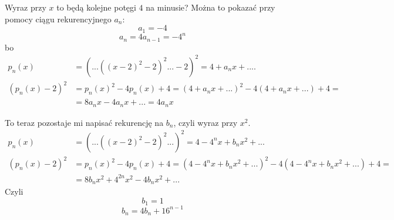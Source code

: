 \documentclass{article}
\begin{document}
Wyraz przy $x$ to będą kolejne potęgi $4$ na minusie? Można to pokazać przy pomocy ciągu rekurencyjnego $a_n$:
$$a_1=-4$$
$$a_n=4a_{n-1}=-4^n$$
bo
\begin{align*}
    p_n(x)&=(...((x-2)^2-2)^2...-2)^2=4+a_nx+....\\
    (p_n(x)-2)^2&=p_n(x)^2-4p_n(x)+4=(4+a_nx+...)^2-4(4+a_nx+...)+4=\\
    &=8a_nx-4a_nx+...=4a_nx
\end{align*}

To teraz pozostaje mi napisać rekurencję na $b_n$, czyli wyraz przy $x^2$.
\begin{align*}
    p_n(x)&=(...((x-2)^2-2)^2...)^2=4-4^nx+b_nx^2+...\\
    (p_n(x)-2)^2&=p_n(x)^2-4p_n(x)+4=(4-4^nx+b_nx^2+...)^2-4(4-4^nx+b_nx^2+...)+4=\\
    &=8b_nx^2+4^{2n}x^2-4b_nx^2+...
\end{align*}
Czyli
$$b_1=1$$
$$b_n=4b_n+16^{n-1}$$
\end{document}
